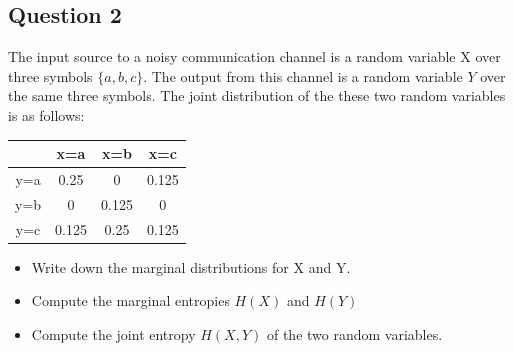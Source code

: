 \documentclass[a4paper,12pt]{article}
\begin{document}
\subsection*{Question 2}

The input source to a noisy communication channel is a random variable X over three symbols $\{a,b,c\}$. The output from this channel is a random variable $Y$ over the same three symbols. The joint distribution of the these two random variables is as follows:

\begin{center}
\begin{tabular}{|c|c|c|c|}
\hline
	&	x=a	&	x=b	&	x=c	\\ \hline
y=a	&	0.25	&	0	&	0.125	\\ \hline
y=b	&	0	&	0.125	&	0	\\ \hline
y=c	&	0.125	&	0.25	&	0.125	\\ \hline
\end{tabular} 
\end{center}

\begin{itemize}
\item Write down the marginal distributions for X and Y.

\item Compute the marginal entropies $H(X)$ and $H(Y)$

\item Compute the joint entropy $H(X,Y)$ of the two random variables.
\end{itemize}
\newpage
\end{document}
